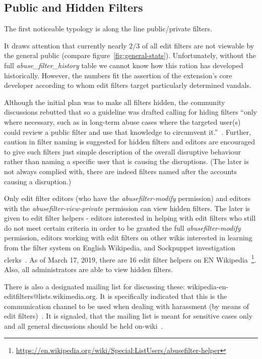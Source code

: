 \subsection{Public and Hidden Filters}

The first noticeable typology is along the line public/private filters.

It draws attention that currently nearly $2/3$ of all edit filters are not viewable by the general public (compare figure~\ref{fig:general-stats}).
Unfortunately, without the full \emph{abuse\_filter\_history} table we cannot know how this ration has developed historically.
However, the numbers fit the assertion of the extension's core developer according to whom edit filters target particularly determined vandals.

Although the initial plan was to make all filters hidden, the community discussions rebutted that so a guideline was drafted calling for
hiding filters ``only where necessary, such as in long-term abuse cases where the targeted user(s) could review a public filter and use that knowledge to circumvent it.''~\cite{Wikipedia:EditFilter}.
Further, caution in filter naming is suggested for hidden filters and editors are encouraged to give such filters just simple description of the overall disruptive behaviour rather than naming a specific user that is causing the disruptions.
(The later is not always complied with, there are indeed filters named after the accounts causing a disruption.)

Only edit filter editors (who have the \emph{abusefilter-modify} permission) and editors with the \emph{abusefilter-view-private} permission can view hidden filters.
The later is given to edit filter helpers - editors interested in helping with edit filters who still do not meet certain criteria in order to be granted the full \emph{abusefilter-modify} permission, editors working with edit filters on other wikis interested in learning from the filter system on English Wikipedia, and Sockpuppet investigation clerks~\cite{Wikipedia:EditFilterHelper}.
As of March 17, 2019, there are 16 edit filter helpers on EN Wikipedia~\footnote{\url{https://en.wikipedia.org/wiki/Special:ListUsers/abusefilter-helper}}.
Also, all administrators are able to view hidden filters.

There is also a designated mailing list for discussing these: wikipedia-en-editfilters@lists.wikimedia.org.
It is specifically indicated that this is the communication channel to be used when dealing with harassment (by means of edit filters)~\cite{Wikipedia:EditFilter}.
It is signaled, that the mailing list is meant for sensitive cases only and all general discussions should be held on-wiki~\cite{Wikipedia:EditFilter}.

